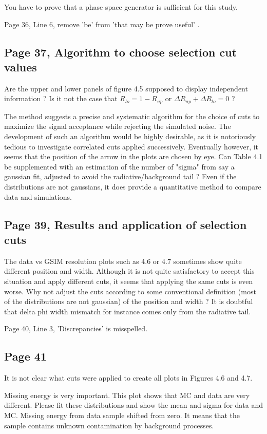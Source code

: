 \documentclass[11pt]{paper}
\begin{document}
You have to prove that a phase space generator is sufficient for this study. 

Page 36, Line 6, remove 'be' from 'that may be prove useful' .

\subsection*{Page 37, Algorithm to choose selection cut values}
Are the upper and lower panels of figure 4.5 supposed to display independent information ?
Is it not the case that $R_{lo} = 1-R_{up}$ or $\Delta R_{up} + \Delta R_{lo} = 0$ ?

The method suggests a precise and systematic algorithm for the choice of cuts to maximize the signal acceptance while rejecting the simulated noise.
The development of such an algorithm would be highly desirable, as it is notoriously tedious to investigate correlated cuts applied successively.
Eventually however, it seems that the position of the arrow in the plots are chosen by eye.
Can Table 4.1 be supplemented with an estimation of the number of "sigma" from say a gaussian fit, adjusted to avoid the radiative/background tail ?
Even if the distributions are not gaussians, it does provide a quantitative method to compare data and simulations.

\subsection*{Page 39, Results and application of selection cuts}

The data vs GSIM resolution plots such as 4.6 or 4.7 sometimes show quite different position and width.
Although it is not quite satisfactory to accept this situation and apply different cuts, it seems that applying the same cuts is even worse.
Why not adjust the cuts according to some conventional definition (most of the distributions are not gaussian) of the position and width ?
It is doubtful that delta phi width mismatch for instance comes only from the radiative tail.

Page 40, Line 3, 'Discrepancies' is misspelled.

\subsection*{Page 41} 
It is not clear what cuts were applied to create all plots in Figures 4.6 and 4.7.

Missing energy is very important. This plot shows that MC and data are very different. 
Please fit these distributions and show the mean and sigma for data and MC. Missing energy from data sample shifted from zero. 
It means that the sample contains unknown contamination by background processes.
\end{document}
